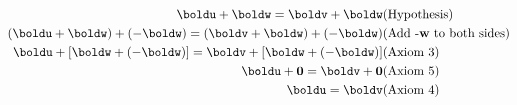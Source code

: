 \\
\begin{solution}
\begin{eqnarray*}
\boldu + \boldw = \boldv + \boldw&\text{(Hypothesis)}\\
(\boldu + \boldw) + (-\boldw) = (\boldv + \boldw) + (-\boldw) &\text{(Add -\textbf{w} to both sides)}\\
\boldu + [\boldw + (-\boldw)] = \boldv + [\boldw + (-\boldw)] &\text{(Axiom 3)}\\
\boldu + \bold0 = \boldv + \bold0 &\text{(Axiom 5)}\\
\boldu = \boldv &\text{(Axiom 4)}
\end{eqnarray*}
\end{solution}


\ee